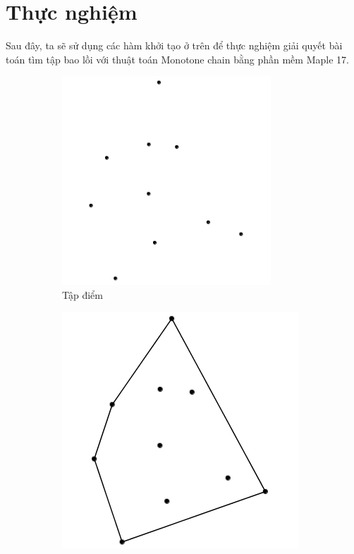 \documentclass[12pt]{article}
\begin{document}
    \section{Thực nghiệm} 
        Sau đây, ta sẽ sử dụng các hàm khởi tạo ở trên để thực nghiệm giải quyết bài toán tìm tập bao lồi với thuật toán Monotone chain bằng phần mềm Maple 17.
        \begin{figure}
          \centering
          \begin{subfigure}[h]{0.4\linewidth}
            \includegraphics[width=\linewidth]{Image/randPoint}
            \caption{Tập điểm}
            \label{fig: points}
          \end{subfigure}
          \begin{subfigure}[h]{0.4\linewidth}
            \includegraphics[width=\linewidth]{Image/polych}

\end{subfigure}
\end{figure}
\end{document}
